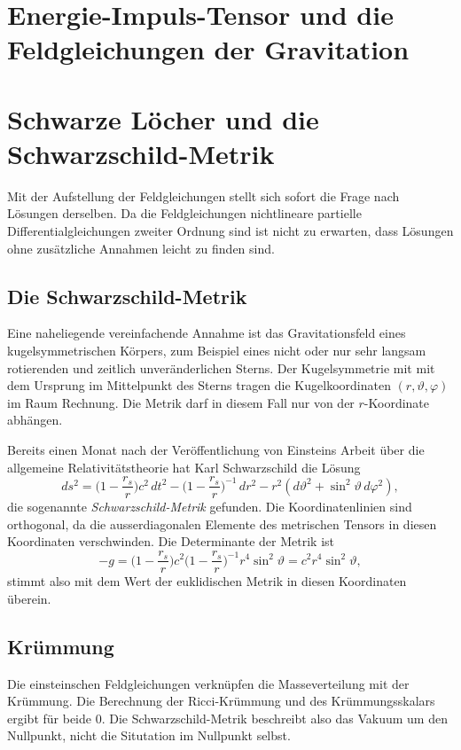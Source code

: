 %
%
\section{Energie-Impuls-Tensor und die Feldgleichungen der Gravitation
\label{buch:kruemmung:section:gravitation}}

%
%
\section{Schwarze Löcher und die Schwarzschild-Metrik
\label{buch:kruemmung:section:schwarzesloch}}
Mit der Aufstellung der Feldgleichungen stellt sich sofort die Frage
nach Lösungen derselben.
Da die Feldgleichungen nichtlineare partielle Differentialgleichungen
zweiter Ordnung sind ist nicht zu erwarten, dass Lösungen ohne
zusätzliche Annahmen leicht zu finden sind.

\subsection{Die Schwarzschild-Metrik}
Eine naheliegende vereinfachende Annahme ist das Gravitationsfeld
eines kugelsymmetrischen Körpers, zum Beispiel eines nicht oder nur
sehr langsam rotierenden und zeitlich unveränderlichen Sterns.
Der Kugelsymmetrie mit mit dem Ursprung im Mittelpunkt des Sterns
tragen die Kugelkoordinaten $(r,\vartheta,\varphi)$ im Raum Rechnung.
Die Metrik darf in diesem Fall nur von der $r$-Koordinate abhängen.

Bereits einen Monat nach der Veröffentlichung von Einsteins Arbeit
über die allgemeine Relativitätstheorie hat Karl Schwarzschild
%
die Lösung
\begin{equation}
ds^2
=
\biggl( 1-\frac{r_s}{r} \biggr)
c^2\,dt^2
-
\biggl(1-\frac{r_s}{r}\biggr)^{-1}
\,dr^2
-r^2 (d\vartheta^2 + \sin^2\vartheta\,d\varphi^2),
\label{buch:kruemmung:blackhole:eqn:schwarzschild}
\end{equation}
die sogenannte \emph{Schwarzschild-Metrik}
%
gefunden.
Die Koordinatenlinien sind orthogonal, da die ausserdiagonalen Elemente
des metrischen Tensors in diesen Koordinaten verschwinden.
Die Determinante der Metrik ist
\[
-g
=
\biggl( 1-\frac{r_s}{r} \biggr)
c^2
\biggl(1-\frac{r_s}{r}\biggr)^{-1}
r^4 \sin^2\vartheta
=
c^2r^4\sin^2\vartheta,
\]
stimmt also mit dem Wert der euklidischen Metrik in diesen Koordinaten
überein.

\subsection{Krümmung}
Die einsteinschen Feldgleichungen verknüpfen die Masseverteilung mit
der Krümmung.
Die Berechnung der Ricci-Krümmung und des Krümmungsskalars ergibt
für beide $0$.
Die Schwarzschild-Metrik beschreibt also das Vakuum um den Nullpunkt,
nicht die Situtation im Nullpunkt selbst.

